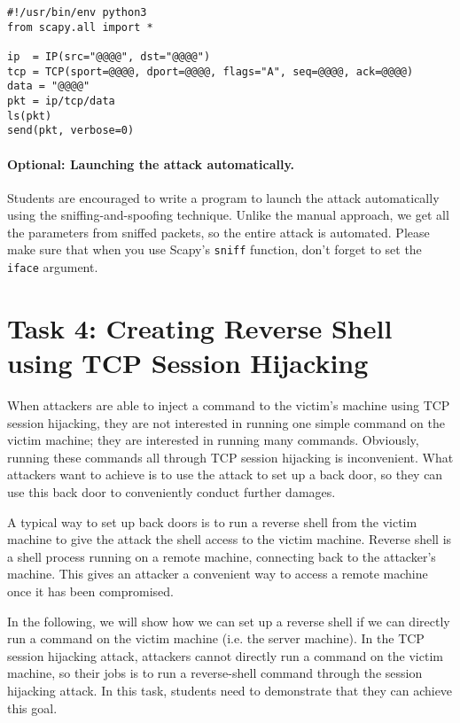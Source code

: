 \begin{lstlisting}
#!/usr/bin/env python3
from scapy.all import *

ip  = IP(src="@@@@", dst="@@@@")
tcp = TCP(sport=@@@@, dport=@@@@, flags="A", seq=@@@@, ack=@@@@)
data = "@@@@"
pkt = ip/tcp/data
ls(pkt)
send(pkt, verbose=0)
\end{lstlisting}


\paragraph{Optional: Launching the attack automatically.}
Students are encouraged to write a program to launch the
attack automatically using the sniffing-and-spoofing technique.
Unlike the manual approach, we get all the parameters
from sniffed packets, so the entire attack is automated.
Please make sure that when you
use Scapy's \texttt{sniff} function, don't forget to
set the \texttt{iface} argument.





\section{Task 4: Creating Reverse Shell using TCP Session Hijacking}

When attackers are able to inject a command to the victim's machine using
TCP session hijacking, they are not interested in running one simple
command on the victim machine; they are interested in running many
commands. Obviously, running these commands all through TCP session
hijacking is inconvenient. What attackers want to achieve is to use the
attack to set up a back door, so they can use this
back door to conveniently conduct further damages.

A typical way to set up back doors is to run a reverse shell from the
victim machine to give the attack the shell access to the victim machine.
Reverse shell is a shell process running on a remote machine, connecting
back to the attacker's machine. This gives an attacker a convenient way to
access a remote machine once it has been compromised. 


In the following, we will show how we can set up a reverse shell if we can
directly run a command on the victim machine (i.e. the server machine). 
In the TCP session hijacking attack, attackers cannot directly run a
command on the victim machine, so their jobs is to run a reverse-shell
command through the session hijacking attack. 
In this task, students need to demonstrate that they can achieve this goal.


